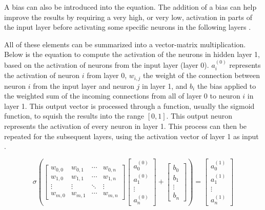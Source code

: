 \documentclass[12pt,a4paper,titlepage]{article}
\begin{document}
A bias can also be introduced into the equation. The addition of a bias can help improve the results by requiring a very high, or very low, activation in parts of the input layer before activating some specific neurons in the following layers \cite{sanderson_but_2017}.

All of these elements can be summarized into a vector-matrix multiplication. Below is the equation to compute the activation of the neurons in hidden layer 1, based on the activation of neurons from the input layer (layer 0). \(a_i^{(0)}\) represents the activation of neuron \(i\) from layer 0, \(w_{i,j}\) the weight of the connection between neuron \(i\) from the input layer and neuron \(j\) in layer 1, and \(b_i\) the bias applied to the weighted sum of the incoming connections from all of layer 0 to neuron \(i\) in layer 1. This output vector is processed through a function, usually the sigmoid function, to squish the results into the range \([0,1]\). This output neuron represents the activation of every neuron in layer 1. This process can then be repeated for the subsequent layers, using the activation vector of layer 1 as input \cite{sanderson_but_2017}.

\begin{displaymath}
	\sigma
	\left(
	\begin{bmatrix}
		w_{0,0} & w_{0,1} & \cdots & w_{0,n}\\
		w_{1,0} & w_{1,1} & \cdots & w_{1,n}\\
		\vdots & \vdots & \ddots & \vdots\\
		w_{m,0} & w_{m,1} & \cdots & w_{m,n}
	\end{bmatrix}
	\begin{bmatrix}
		a_{0}^{(0)}\\
		a_{1}^{(0)}\\
		\vdots\\
		a_{n}^{(0)}
	\end{bmatrix}
	+
	\begin{bmatrix}
		b_{0}\\
		b_{1}\\
		\vdots\\
		b_{n}
	\end{bmatrix}
	\right)
	=
	\begin{bmatrix}
		a_{0}^{(1)}\\
		a_{1}^{(1)}\\
		\vdots\\
		a_{n}^{(1)}
	\end{bmatrix}
\end{displaymath}
\end{document}
